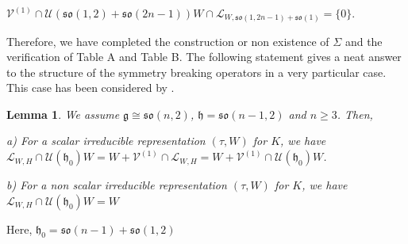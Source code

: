 \documentclass[12pt]{amsart}
\newtheorem{lem}[thm]{Lemma}
\theoremstyle{definition}
\theoremstyle{remark}
\newcommand{\g}{\mathfrak{g}}
\newcommand{\h}{\mathfrak{h}}
\numberwithin{equation}{section}
\begin{document}
\label{eq:so2n2n-1}$ \mathcal V^{(1)} \cap \mathcal U(\mathfrak{so}(1,2)+\mathfrak{so}( 2n-1))W \cap \mathcal L_{W, \mathfrak{so}(1,2n-1)+\mathfrak{so}(1)}  =\{0\}$.

Therefore, we have completed the construction or non existence of $\Sigma$ and the verification of Table A and Table B.
The following statement gives a neat answer to the structure of the symmetry breaking operators in a very particular case. This case has been considered by \cite[Theorem 5.3]{KP2}.
\begin{lem}\label{lem:sonn-12} We assume $\g\cong \mathfrak{so}(n,2)$, $\h=\mathfrak{so}(n-1,2)$ and $n\geq 3$. Then,

a) For a scalar irreducible representation $(\tau, W)$ for $K$, we have $ \mathcal L_{W,H}\cap \mathcal U(\h_0)W= W+\mathcal V^{(1)} \cap \mathcal L_{W,H}= W+\mathcal V^{(1)} \cap \mathcal U(\h_0)W$.

b) For a non  scalar irreducible representation $(\tau, W)$ for $K$, we have $ \mathcal L_{W,H}\cap \mathcal U(\h_0)W= W$
\end{lem}
Here, $\h_0=\mathfrak{so}(n-1) +\mathfrak{so}(1,2)$
\end{document}
